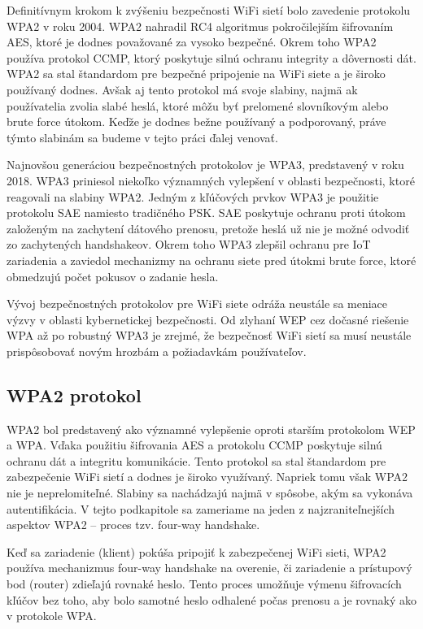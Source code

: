 \documentclass[12pt, twoside]{book}
\begin{document}
Definitívnym krokom k zvýšeniu bezpečnosti WiFi sietí bolo zavedenie protokolu WPA2 v roku 2004. WPA2 nahradil RC4 algoritmus pokročilejším šifrovaním AES, ktoré je dodnes považované za vysoko bezpečné. Okrem toho WPA2 používa protokol CCMP, ktorý poskytuje silnú ochranu integrity a dôvernosti dát. WPA2 sa stal štandardom pre bezpečné pripojenie na WiFi siete a je široko používaný dodnes. \cite{wpa3_adoption} Avšak aj tento protokol má svoje slabiny, najmä ak používatelia zvolia slabé heslá, ktoré môžu byť prelomené slovníkovým alebo brute force útokom. Keďže je dodnes bežne používaný a podporovaný, práve týmto slabinám sa budeme v tejto práci ďalej venovať.

Najnovšou generáciou bezpečnostných protokolov je WPA3, predstavený v roku 2018. WPA3 priniesol niekoľko významných vylepšení v oblasti bezpečnosti, ktoré reagovali na slabiny WPA2. Jedným z kľúčových prvkov WPA3 je použitie protokolu SAE namiesto tradičného PSK. SAE poskytuje ochranu proti útokom založeným na zachytení dátového prenosu, pretože heslá už nie je možné odvodiť zo zachytených handshakeov. Okrem toho WPA3 zlepšil ochranu pre IoT zariadenia a zaviedol mechanizmy na ochranu siete pred útokmi brute force, ktoré obmedzujú počet pokusov o zadanie hesla.\cite{vseob_2}

Vývoj bezpečnostných protokolov pre WiFi siete odráža neustále sa meniace výzvy v oblasti kybernetickej bezpečnosti. Od zlyhaní WEP cez dočasné riešenie WPA až po robustný WPA3 je zrejmé, že bezpečnosť WiFi sietí sa musí neustále prispôsobovať novým hrozbám a požiadavkám používateľov.

\subsection{WPA2 protokol}
WPA2 bol predstavený ako významné vylepšenie oproti starším protokolom WEP a WPA. Vďaka použitiu šifrovania AES a protokolu CCMP poskytuje silnú ochranu dát a integritu komunikácie. Tento protokol sa stal štandardom pre zabezpečenie WiFi sietí a dodnes je široko využívaný.\cite{wpa3_adoption} Napriek tomu však WPA2 nie je neprelomiteľné. Slabiny sa nachádzajú najmä v spôsobe, akým sa vykonáva autentifikácia. V tejto podkapitole sa zameriame na jeden z najzraniteľnejších aspektov WPA2 – proces tzv. four-way handshake.

Keď sa zariadenie (klient) pokúša pripojiť k zabezpečenej WiFi sieti, WPA2 používa mechanizmus four-way handshake na overenie, či zariadenie a prístupový bod (router) zdieľajú rovnaké heslo. Tento proces umožňuje výmenu šifrovacích kľúčov bez toho, aby bolo samotné heslo odhalené počas prenosu a je rovnaký ako v protokole WPA.\cite{vseob_1, slabiny_po_2}
\end{document}
